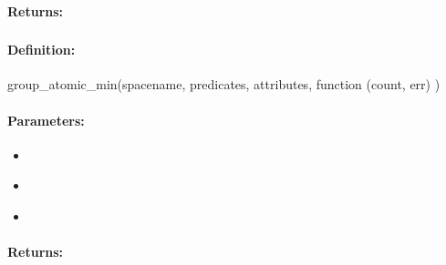 \paragraph{Returns:}


\pagebreak
\subsubsection{}
\label{api:nodejs:group_atomic_min}


\paragraph{Definition:}
\begin{javascriptcode}
group_atomic_min(spacename, predicates, attributes, function (count, err) {})
\end{javascriptcode}
\paragraph{Parameters:}
\begin{itemize}[noitemsep]
\item {}\\

\item {}\\

\item {}\\

\end{itemize}

\paragraph{Returns:}


\pagebreak
\subsubsection{}
\label{api:nodejs:atomic_min}


